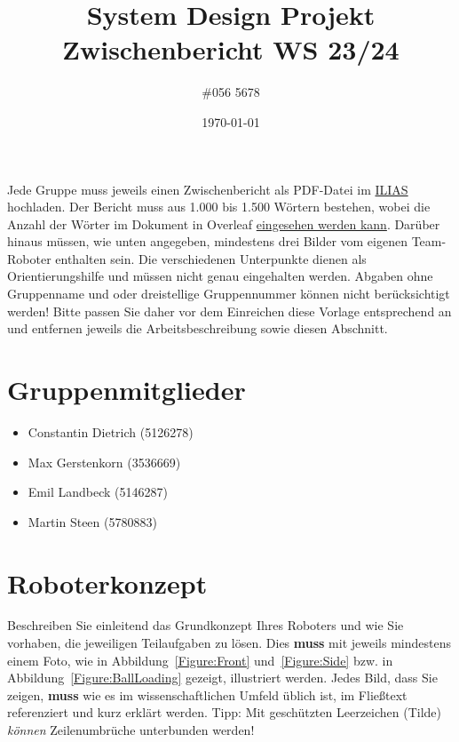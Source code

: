 \documentclass[12pt]{article}
\title{
  \vspace{2cm}  %
  \Huge System Design Projekt\\[0.25cm]
  \LARGE Zwischenbericht WS 23/24
}
\author{\Large \#056 5678}
\date{\today}  %
\begin{document}
\maketitle  %

Jede Gruppe muss jeweils einen Zwischenbericht als PDF-Datei im \href{https://sdp.uni-freiburg.de/redirect/ilias}{ILIAS} hochladen. 
%
%
Der Bericht muss aus 1.000 bis 1.500 Wörtern bestehen, wobei die Anzahl der Wörter im Dokument in Overleaf \href{https://www.overleaf.com/learn/how-to/Is_there_a_way_to_run_a_word_count_that_doesn%
}{eingesehen werden kann}.
%
%
Darüber hinaus müssen, wie unten angegeben, mindestens drei Bilder vom eigenen Team-Roboter enthalten sein. Die verschiedenen Unterpunkte dienen als Orientierungshilfe und müssen nicht genau eingehalten werden. Abgaben ohne Gruppenname und oder dreistellige Gruppennummer können nicht berücksichtigt werden! Bitte passen Sie daher vor dem Einreichen diese Vorlage entsprechend an und entfernen jeweils die Arbeitsbeschreibung sowie diesen Abschnitt.

\section{Gruppenmitglieder}
\begin{itemize}
  \item Constantin Dietrich (5126278)
  \item Max Gerstenkorn (3536669)
  \item Emil Landbeck (5146287)
  \item Martin Steen (5780883)
\end{itemize}

\section{Roboterkonzept}
Beschreiben Sie einleitend das Grundkonzept Ihres Roboters und wie Sie vorhaben, die jeweiligen Teilaufgaben zu lösen. Dies \textbf{muss} mit jeweils mindestens einem Foto, wie in Abbildung~\ref{Figure:Front} und~\ref{Figure:Side} bzw. in Abbildung~\ref{Figure:BallLoading} gezeigt, illustriert werden. Jedes Bild, dass Sie zeigen, \textbf{muss} wie es im wissenschaftlichen Umfeld üblich ist, im Fließtext referenziert und kurz erklärt werden. Tipp: Mit geschützten Leerzeichen (Tilde) \textit{können} Zeilenumbrüche unterbunden werden!
\end{document}
